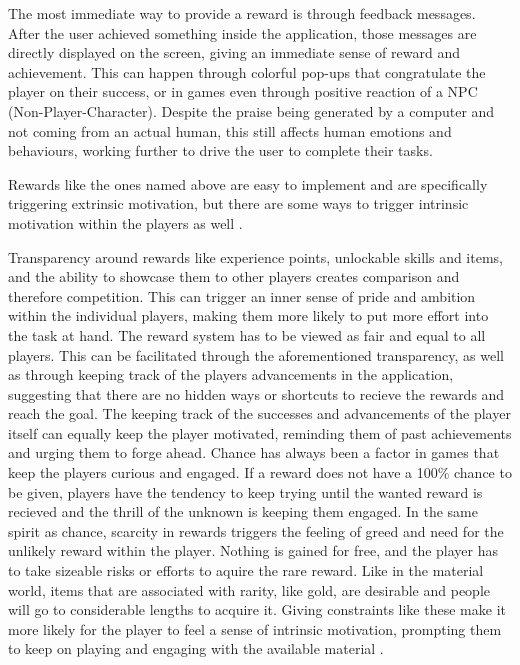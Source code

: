 The most immediate way to provide a reward is through feedback messages. After the user achieved something inside the application, those messages are directly displayed on the screen, giving an immediate sense of reward and achievement. This can happen through colorful pop-ups that congratulate the player on their success, or in games even through positive reaction of a NPC (Non-Player-Character). Despite the praise being generated by a computer and not coming from an actual human, this still affects human emotions and behaviours, working further to drive the user to complete their tasks.

Rewards like the ones named above are easy to implement and are specifically triggering extrinsic motivation, but there are some ways to trigger intrinsic motivation within the players as well \cite{mmo}.

Transparency around rewards like experience points, unlockable skills and items, and the ability to showcase them to other players creates comparison and therefore competition. This can trigger an inner sense of pride and ambition within the individual players, making them more likely to put more effort into the task at hand.
The reward system has to be viewed as fair and equal to all players. This can be facilitated through the aforementioned transparency, as well as through keeping track of the players advancements in the application, suggesting that there are no hidden ways or shortcuts to recieve the rewards and reach the goal. The keeping track of the successes and advancements of the player itself can equally keep the player motivated, reminding them of past achievements and urging them to forge ahead.
Chance has always been a factor in games that keep the players curious and engaged. If a reward does not have a 100\% chance to be given, players have the tendency to keep trying until the wanted reward is recieved and the thrill of the unknown is keeping them engaged.
In the same spirit as chance, scarcity in rewards triggers the feeling of greed and need for the unlikely reward within the player. Nothing is gained for free,  and the player has to take sizeable risks or efforts to aquire the rare reward. Like in the material world, items that are associated with rarity, like gold, are desirable and people will go to considerable lengths to acquire it.
Giving constraints like these make it more likely for the player to feel a sense of intrinsic motivation, prompting them to keep on playing and engaging with the available material \cite{mmo}.

